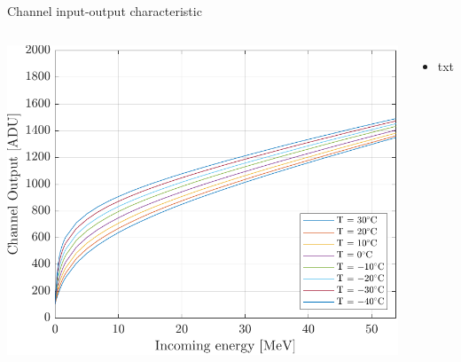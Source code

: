 \documentclass[aspectratio=169,xcolor=dvipsnames]{beamer}
\begin{document}
{\begin{frame}{Channel input-output characteristic}
\begin{columns}[T]
            \vskip-0.4cm
            \begin{center}
                \includegraphics[height=0.48\textheight]{images/temperature_effects/fdt_csavrefgm_530mV_tau6_keV.pdf}
            \end{center}
    
            \vskip-0.2cm
            \begin{itemize}
                \item txt
            \end{itemize}
    
    \end{columns}
\end{frame}
}
\end{document}
